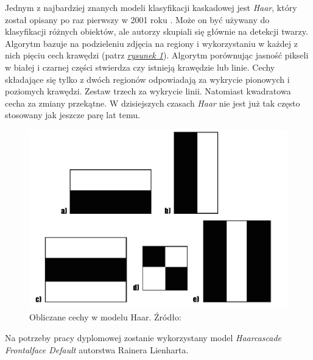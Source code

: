 Jednym z najbardziej znanych modeli klasyfikacji kaskadowej jest \textit{Haar}, który został opisany po raz pierwszy w 2001 roku \cite{haar_proceeding}. Może on być używany do klasyfikacji różnych obiektów, ale autorzy skupiali się głównie na detekcji twarzy. Algorytm \cite{haar_towards} \cite{haar_pyimage} \cite{OBUKHOV2011517} bazuje na podzieleniu zdjęcia na regiony i wykorzystaniu w każdej z nich pięciu cech krawędzi (patrz \hyperref[{fig:haar_features}]{\textit{rysunek \ref{fig:haar_features}}}). Algorytm porównując jasność pikseli w białej i czarnej części stwierdza czy istnieją krawędzie lub linie. Cechy składające się tylko z dwóch regionów odpowiadają za wykrycie pionowych i poziomych krawędzi. Zestaw trzech za wykrycie linii. Natomiast kwadratowa cecha za zmiany przekątne. W dzisiejszych czasach \textit{Haar} nie jest już tak często stosowany jak jeszcze parę lat temu.

\begin{figure}[!h]
    \begin{center}
        \includegraphics[scale=0.2]{img/face_section/haar_features.png}
        \caption{Obliczane cechy w modelu Haar. Źródło: \cite{haar_towards}}
        \label{fig:haar_features}
    \end{center}
\end{figure}

Na potrzeby pracy dyplomowej zostanie wykorzystany model \textit{Haarcascade Frontalface Default} \cite{haar_frontal} autorstwa Rainera Lienharta.



